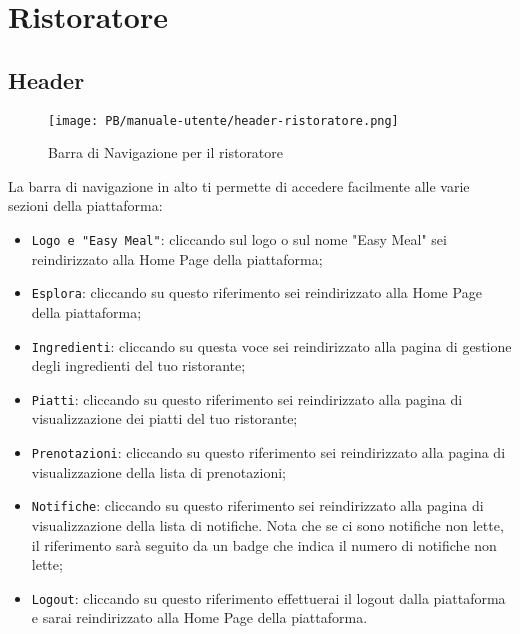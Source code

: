 \section{Ristoratore}

\subsection{Header}

\begin{figure}[htbp]
    \centering
	\texttt{[image: PB/manuale-utente/header-ristoratore.png]}
    \caption{Barra di Navigazione per il ristoratore}
\end{figure}

La barra di navigazione in alto ti permette di accedere facilmente alle varie 
sezioni della piattaforma:
\begin{itemize}
	\item \texttt{Logo e "Easy Meal"}: cliccando sul logo o sul nome "Easy Meal"
		sei reindirizzato alla Home Page della piattaforma;

	\item \texttt{Esplora}: cliccando su questo riferimento sei reindirizzato
		alla Home Page della piattaforma;

	\item \texttt{Ingredienti}: cliccando su questa voce sei reindirizzato alla
		pagina di gestione degli ingredienti del tuo ristorante;

	\item \texttt{Piatti}: cliccando su questo riferimento sei reindirizzato
		alla pagina di visualizzazione dei piatti del tuo ristorante;

	\item \texttt{Prenotazioni}: cliccando su questo riferimento sei 
		reindirizzato alla pagina di visualizzazione della lista di
		prenotazioni;

	\item \texttt{Notifiche}: cliccando su questo riferimento sei reindirizzato
		alla pagina di visualizzazione della lista di notifiche. Nota che se ci
		sono notifiche non lette, il riferimento sarà seguito da un badge che
		indica il numero di notifiche non lette;

	\item \texttt{Logout}: cliccando su questo riferimento effettuerai il logout
		dalla piattaforma e sarai reindirizzato alla Home Page della 
		piattaforma.
\end{itemize}

